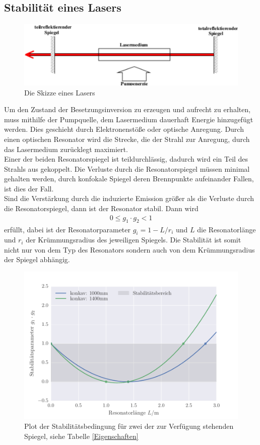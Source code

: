 \subsection{Stabilität eines Lasers}
\begin{figure}[h!]
\centering
\includegraphics[scale=0.75]{../Grafiken/Laser.pdf}
\caption{Die Skizze eines Lasers\cite{V61}\label{SkizzeLaser}}
\end{figure}
 Um den Zustand der Besetzungsinversion zu erzeugen und aufrecht zu erhalten, muss mithilfe der Pumpquelle, dem Lasermedium dauerhaft Energie hinzugefügt werden. Dies geschieht durch Elektronenstöße oder optische Anregung. Durch einen optischen Resonator wird die Strecke, die der Strahl zur Anregung, durch das Lasermedium zurücklegt maximiert.\\
Einer der beiden Resonatorspiegel ist teildurchlässig, dadurch wird ein Teil des Strahls aus gekoppelt. Die Verluste durch die Resonatorspiegel müssen minimal gehalten werden, durch konfokale Spiegel deren Brennpunkte aufeinander Fallen, ist dies der Fall.\\
Sind die Verstärkung durch die induzierte Emission größer als die Verluste durch die Resonatorspiegel, dann ist der Resonator stabil. Dann wird
\begin{align}
0\le g_1\cdot g_2 < 1
\end{align}
erfüllt, dabei ist der Resonatorparameter $g_i=1-L/r_i$ und $L$ die Resonatorlänge und $r_i$ der Krümmungsradius des jeweiligen Spiegels. Die Stabilität ist somit nicht nur von dem Typ des Resonators sondern auch von dem Krümmungsradius der Spiegel abhängig.
\begin{figure}
\centering
\includegraphics[scale=0.75]{../Grafiken/Stabilitaetsparameter.pdf}
\caption{Plot der Stabilitätsbedingung für zwei der zur Verfügung stehenden Spiegel, siehe Tabelle \ref{Eigenschaften}}
\label{fig:Stabilitaet}
\end{figure}
